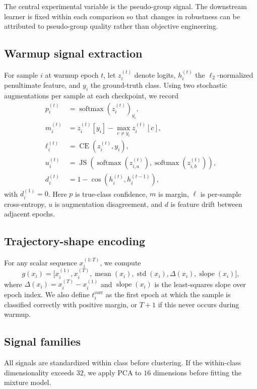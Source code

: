 \documentclass{article}
\begin{document}
The central experimental variable is the pseudo-group signal. The downstream learner is fixed within each comparison so that changes in robustness can be attributed to pseudo-group quality rather than objective engineering.

\subsection{Warmup signal extraction}
For sample $i$ at warmup epoch $t$, let $z_i^{(t)}$ denote logits, $h_i^{(t)}$ the $\ell_2$-normalized penultimate feature, and $y_i$ the ground-truth class. Using two stochastic augmentations per sample at each checkpoint, we record
\begin{align}
  p_i^{(t)} &= \operatorname{softmax}(z_i^{(t)})_{y_i}, \\
  m_i^{(t)} &= z_i^{(t)}[y_i] - \max_{c \neq y_i} z_i^{(t)}[c], \\
  \ell_i^{(t)} &= \operatorname{CE}(z_i^{(t)}, y_i), \\
  u_i^{(t)} &= \operatorname{JS}(\operatorname{softmax}(z_{i,a}^{(t)}), \operatorname{softmax}(z_{i,b}^{(t)})), \\
  d_i^{(t)} &= 1 - \cos(h_i^{(t)}, h_i^{(t-1)}),
\end{align}
with $d_i^{(1)} = 0$. Here $p$ is true-class confidence, $m$ is margin, $\ell$ is per-sample cross-entropy, $u$ is augmentation disagreement, and $d$ is feature drift between adjacent epochs.

\subsection{Trajectory-shape encoding}
For any scalar sequence $x_i^{(1:T)}$, we compute
\begin{equation}
  g(x_i) = \big[x_i^{(1)}, x_i^{(T)}, \operatorname{mean}(x_i), \operatorname{std}(x_i), \Delta(x_i), \operatorname{slope}(x_i)\big],
\end{equation}
where $\Delta(x_i) = x_i^{(T)} - x_i^{(1)}$ and $\operatorname{slope}(x_i)$ is the least-squares slope over epoch index. We also define $t_i^{\mathrm{corr}}$ as the first epoch at which the sample is classified correctly with positive margin, or $T+1$ if this never occurs during warmup.

\subsection{Signal families}
All signals are standardized within class before clustering. If the within-class dimensionality exceeds $32$, we apply PCA to $16$ dimensions before fitting the mixture model.
\end{document}
